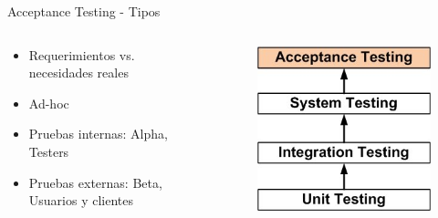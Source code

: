 \documentclass{beamer}
\begin{document}
\begin{frame}{Acceptance Testing - Tipos}
\begin{columns}[T]
\begin{column}[T]{6cm}
\begin{itemize}
\item Requerimientos vs. necesidades reales
\item Ad-hoc
\item Pruebas internas: Alpha, Testers
\item Pruebas externas: Beta, Usuarios y clientes
\end{itemize}
\end{column}
\begin{column}[T]{4cm} %
\begin{figure}
\centering
\includegraphics[width=0.8\linewidth]{Images/acceptancetesting}
\end{figure}
\end{column}
\end{columns}
\end{frame}
\end{document}
